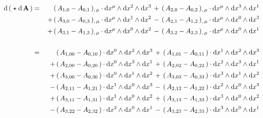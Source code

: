 \begin{enumerate}
\begin{eqnarray*}
	\d\left(\;\star\;\d\,\mathbf{A}\,\right)
	& = &
		\,{\color{white}+}\,
		(\,A_{1,0} \overset{{\color{white}.}}{-} A_{0,1}\,)_{,\,\mu} \cdot \d x^{\mu} \wedge \d x^{2} \wedge \d x^{3}
		\,+\,
		(\,A_{2,0} \overset{{\color{white}.}}{-} A_{0,2}\,)_{,\,\mu} \cdot \d x^{\mu} \wedge \d x^{3} \wedge \d x^{1}
	\\
	&&
		\,+\,
		(\,A_{3,0} \overset{{\color{white}.}}{-} A_{0,3}\,)_{,\,\mu} \cdot \d x^{\mu} \wedge \d x^{1} \wedge \d x^{2}
		\,-\,
		(\,A_{2,1} \overset{{\color{white}.}}{-} A_{1,2}\,)_{,\,\mu} \cdot \d x^{\mu} \wedge \d x^{0} \wedge \d x^{3}
	\\
	&&
		\,+\,
		(\,A_{3,1} \overset{{\color{white}.}}{-} A_{1,3}\,)_{,\,\mu} \cdot \d x^{\mu} \wedge \d x^{0} \wedge \d x^{2}
		\,-\,
		(\,A_{3,2} \overset{{\color{white}.}}{-} A_{2,3}\,)_{,\,\mu} \cdot \d x^{\mu} \wedge \d x^{0} \wedge \d x^{1}
	\\ \\
	& = &
		\,{\color{white}+}\,
		(\,A_{1,00} \overset{{\color{white}.}}{-} A_{0,10}\,) \cdot \d x^{0} \wedge \d x^{2} \wedge \d x^{3}
		\,+\,
		(\,A_{1,01} \overset{{\color{white}.}}{-} A_{0,11}\,) \cdot \d x^{1} \wedge \d x^{2} \wedge \d x^{3}
	\\
	&&
		\,+\,
		(\,A_{2,00} \overset{{\color{white}.}}{-} A_{0,20}\,) \cdot \d x^{0} \wedge \d x^{3} \wedge \d x^{1}
		\,+\,
		(\,A_{2,02} \overset{{\color{white}.}}{-} A_{0,22}\,) \cdot \d x^{2} \wedge \d x^{3} \wedge \d x^{1}
	\\
	&&
		\,+\,
		(\,A_{3,00} \overset{{\color{white}.}}{-} A_{0,30}\,) \cdot \d x^{0} \wedge \d x^{1} \wedge \d x^{2}
		\,+\,
		(\,A_{3,03} \overset{{\color{white}.}}{-} A_{0,33}\,) \cdot \d x^{3} \wedge \d x^{1} \wedge \d x^{2}
	\\
	&&
		\,-\,
		(\,A_{2,11} \overset{{\color{white}.}}{-} A_{1,21}\,) \cdot \d x^{1} \wedge \d x^{0} \wedge \d x^{3}
		\,-\,
		(\,A_{2,12} \overset{{\color{white}.}}{-} A_{1,22}\,) \cdot \d x^{2} \wedge \d x^{0} \wedge \d x^{3}
	\\
	&&
		\,+\,
		(\,A_{3,11} \overset{{\color{white}.}}{-} A_{1,31}\,) \cdot \d x^{1} \wedge \d x^{0} \wedge \d x^{2}
		\,+\,
		(\,A_{3,13} \overset{{\color{white}.}}{-} A_{1,33}\,) \cdot \d x^{3} \wedge \d x^{0} \wedge \d x^{2}
	\\
	&&
		\,-\,
		(\,A_{3,22} \overset{{\color{white}.}}{-} A_{2,32}\,) \cdot \d x^{2} \wedge \d x^{0} \wedge \d x^{1}
		\,-\,
		(\,A_{3,23} \overset{{\color{white}.}}{-} A_{2,33}\,) \cdot \d x^{3} \wedge \d x^{0} \wedge \d x^{1}
	\\ \\

\end{eqnarray*}
\end{enumerate}
